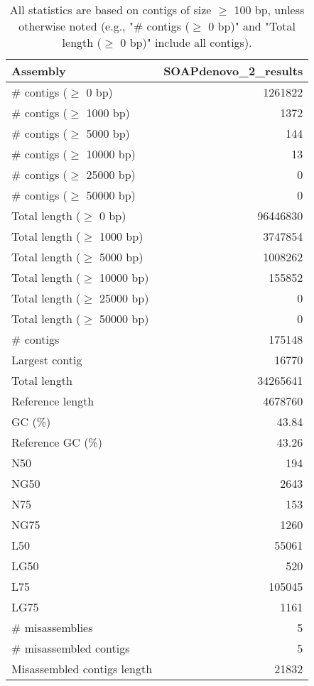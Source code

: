 \documentclass[12pt,a4paper]{article}
\begin{document}
\begin{table}[ht]
\begin{center}
\caption{All statistics are based on contigs of size $\geq$ 100 bp, unless otherwise noted (e.g., "\# contigs ($\geq$ 0 bp)" and "Total length ($\geq$ 0 bp)" include all contigs).}
\begin{tabular}{|l*{1}{|r}|}
\hline
Assembly & SOAPdenovo\_2\_results \\ \hline
\# contigs ($\geq$ 0 bp) & 1261822 \\ \hline
\# contigs ($\geq$ 1000 bp) & 1372 \\ \hline
\# contigs ($\geq$ 5000 bp) & 144 \\ \hline
\# contigs ($\geq$ 10000 bp) & 13 \\ \hline
\# contigs ($\geq$ 25000 bp) & 0 \\ \hline
\# contigs ($\geq$ 50000 bp) & 0 \\ \hline
Total length ($\geq$ 0 bp) & 96446830 \\ \hline
Total length ($\geq$ 1000 bp) & 3747854 \\ \hline
Total length ($\geq$ 5000 bp) & 1008262 \\ \hline
Total length ($\geq$ 10000 bp) & 155852 \\ \hline
Total length ($\geq$ 25000 bp) & 0 \\ \hline
Total length ($\geq$ 50000 bp) & 0 \\ \hline
\# contigs & 175148 \\ \hline
Largest contig & 16770 \\ \hline
Total length & 34265641 \\ \hline
Reference length & 4678760 \\ \hline
GC (\%) & 43.84 \\ \hline
Reference GC (\%) & 43.26 \\ \hline
N50 & 194 \\ \hline
NG50 & 2643 \\ \hline
N75 & 153 \\ \hline
NG75 & 1260 \\ \hline
L50 & 55061 \\ \hline
LG50 & 520 \\ \hline
L75 & 105045 \\ \hline
LG75 & 1161 \\ \hline
\# misassemblies & 5 \\ \hline
\# misassembled contigs & 5 \\ \hline
Misassembled contigs length & 21832 \\ \hline

\end{tabular}
\end{center}
\end{table}
\end{document}
